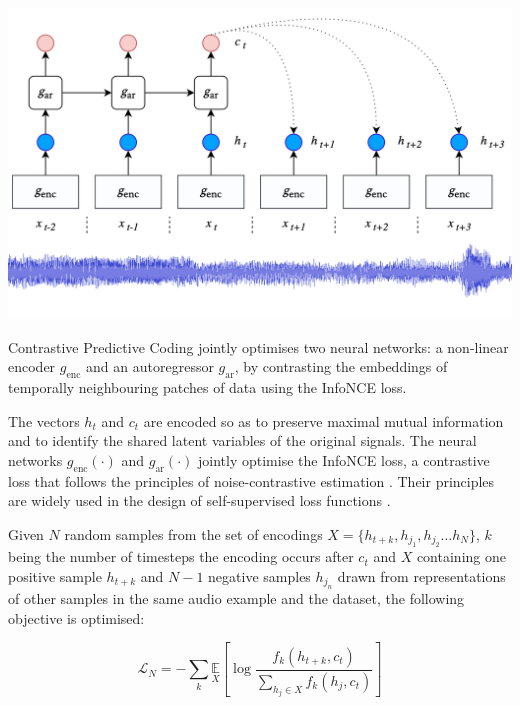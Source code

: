 \begin{marginfigure}[{-1cm}]
    \includegraphics[width=\textwidth]{figs/cpc_model.png}
    \caption{Contrastive Predictive Coding jointly optimises two neural networks: a non-linear encoder $g_{\mathrm{enc}}$ and an autoregressor $g_{\mathrm{ar}}$, by contrasting the embeddings of temporally neighbouring patches of data using the InfoNCE loss.}
    \label{fig:cpc_model}
\end{marginfigure}

The vectors $h_t$ and $c_t$ are encoded so as to preserve maximal mutual information and to identify the shared latent variables of the original signals. The neural networks $g_{\mathrm{enc}}(\cdot)$ and $g_{\mathrm{ar}}(\cdot)$ jointly optimise the InfoNCE loss, a contrastive loss that follows the principles of noise-contrastive estimation \cite{gutmann_noise-contrastive_nodate}. Their principles are widely used in the design of self-supervised loss functions \cite{oord_representation_2019, sohn2020fixmatch, chen_simple_2020}.

Given $N$ random samples from the set of encodings $X = \{h_{t+k}, h_{j_1}, h_{j_2} \hdots h_N\}$, $k$ being the number of timesteps the encoding occurs after $c_t$ and $X$ containing one positive sample $h_{t+k}$ and $N-1$ negative samples $h_{j_{n}}$ drawn from representations of other samples in the same audio example and the dataset, the following objective is optimised:

\begin{equation}
    \mathcal{L}_{N}=-\sum_{k} \underset{X}{\mathbb{E}}\left[\log \frac{f_{k}\left(h_{t+k}, c_{t}\right)}{\sum_{h_{j} \in X} f_{k}\left(h_{j}, c_{t}\right)}\right]
\end{equation}


